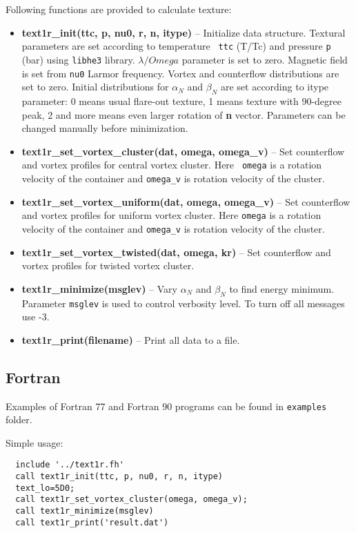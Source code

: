 \documentclass[a4paper]{article}
\begin{document}
Following functions are provided to calculate texture:
\begin{itemize}

\item {\bf text1r\_init(ttc, p, nu0, r, n, itype)} -- Initialize data
structure. Textural parameters are set according to temperature {\tt
ttc} (T/Tc) and pressure {\tt p} (bar) using {\tt libhe3} library.
$\lambda/Omega$ parameter is set to zero. Magnetic field is set from
{\tt nu0} Larmor frequency. Vortex and counterflow distributions are set
to zero. Initial distributions for $\alpha_N$ and $\beta_N$ are set
according to itype parameter: 0 means usual flare-out texture, 1 means
texture with 90-degree peak, 2 and more means even larger rotation of
{\bf n} vector. Parameters can be changed manually before minimization.

\item {\bf text1r\_set\_vortex\_cluster(dat, omega, omega\_v)} -- Set
counterflow and vortex profiles for central vortex cluster. Here {\tt
omega} is a rotation velocity of the container and {\tt omega\_v} is
rotation velocity of the cluster.

\item {\bf text1r\_set\_vortex\_uniform(dat, omega, omega\_v)} -- Set
counterflow and vortex profiles for uniform vortex cluster. Here
{\tt omega} is a rotation velocity of the container and {\tt omega\_v}
is rotation velocity of the cluster.

\item {\bf text1r\_set\_vortex\_twisted(dat, omega, kr)} -- Set
counterflow and vortex profiles for twisted vortex cluster.

\item {\bf text1r\_minimize(msglev)} -- Vary $\alpha_N$ and $\beta_N$
to find energy minimum. Parameter {\tt msglev} is used to control verbosity
level. To turn off all messages use -3.

\item {\bf text1r\_print(filename)} -- Print all data to a file.

\end{itemize}

\eject
\subsection*{Fortran}

Examples of Fortran 77 and Fortran 90 programs can be found in
{\tt examples} folder.

Simple usage:
\begin{verbatim}
  include '../text1r.fh'
  call text1r_init(ttc, p, nu0, r, n, itype)
  text_lo=5D0;
  call text1r_set_vortex_cluster(omega, omega_v);
  call text1r_minimize(msglev)
  call text1r_print('result.dat')
\end{verbatim}
\end{document}
